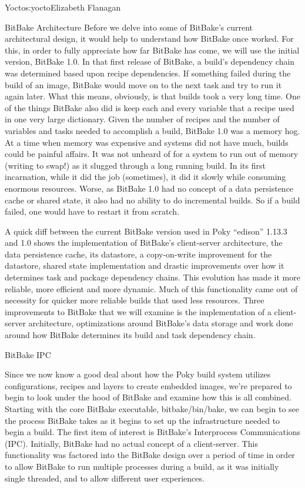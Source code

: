\begin{aosachapter}{Yocto}{s:yocto}{Elizabeth Flanagan}
\begin{aosasect1}{BitBake Architecture}
Before we delve into some of BitBake's current architectural design,
it would help to understand how BitBake once worked. For this, in
order to fully appreciate how far BitBake has come, we will use the
initial version, BitBake 1.0. In that first release of BitBake, a
build's dependency chain was determined based upon recipe
dependencies. If something failed during the build of an image,
BitBake would move on to the next task and try to run it again later.
What this means, obviously, is that builds took a very long time. One
of the things BitBake also did is keep each and every variable that a
recipe used in one very large dictionary. Given the number of recipes
and the number of variables and tasks needed to accomplish a build,
BitBake 1.0 was a memory hog. At a time when memory was expensive and
systems did not have much, builds could be painful affairs. It was not
unheard of for a system to run out of memory (writing to swap!)  as it
slugged through a long running build. In its first incarnation, while
it did the job (sometimes), it did it slowly while consuming enormous
resources. Worse, as BitBake 1.0 had no concept of a data persistence
cache or shared state, it also had no ability to do incremental
builds. So if a build failed, one would have to restart it from
scratch.

A quick diff between the current BitBake version used in Poky
``edison'' 1.13.3 and 1.0 shows the implementation of BitBake's
client-server architecture, the data persistence cache, its datastore,
a copy-on-write improvement for the datastore, shared state
implementation and drastic improvements over how it determines task
and package dependency chains. This evolution has made it more
reliable, more efficient and more dynamic. Much of this functionality
came out of necessity for quicker more reliable builds that used less
resources. Three improvements to BitBake that we will examine is the
implementation of a client-server architecture, optimizations around
BitBake's data storage and work done around how BitBake determines its
build and task dependency chain.

\begin{aosasect2}{BitBake IPC}

Since we now know a good deal about how the Poky build system utilizes
configurations, recipes and layers to create embedded images, we're
prepared to begin to look under the hood of BitBake and examine how
this is all combined. Starting with the core BitBake executable,
bitbake/bin/bake, we can begin to see the process BitBake takes as it
begins to set up the infrastructure needed to begin a build. The first
item of interest is BitBake's Interprocess Communications
(IPC). Initially, BitBake had no actual concept of a
client-server. This functionality was factored into the BitBake design
over a period of time in order to allow BitBake to run multiple
processes during a build, as it was initially single threaded, and to
allow different user experiences.


\end{aosasect2}
\end{aosasect1}
\end{aosachapter}
